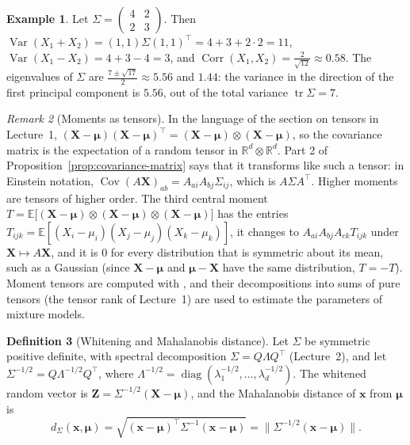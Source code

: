 \documentclass[11pt]{article}
\newcommand{\py}[1]{\texttt{\detokenize{#1}}}
\newcommand{\norm}[1]{\lVert #1 \rVert}
\newcommand{\E}{\mathbb{E}}
\DeclareMathOperator{\Var}{Var}
\DeclareMathOperator{\Cov}{Cov}
\DeclareMathOperator{\Corr}{Corr}
\theoremstyle{definition}
\newtheorem{definition}{Definition}[section]
\newtheorem{example}[definition]{Example}
\theoremstyle{plain}
\theoremstyle{remark}
\newtheorem{remark}[definition]{Remark}
\DeclareMathOperator{\tr}{tr}
\DeclareMathOperator{\diag}{diag}
\begin{document}
\begin{example}\label{ex:covariance-matrix}
    Let $\Sigma = \begin{pmatrix} 4 & 2 \\ 2 & 3 \end{pmatrix}$. Then $\Var(X_1 + X_2) = (1, 1)\Sigma(1, 1)^\top = 4 + 3 + 2 \cdot 2 = 11$, $\Var(X_1 - X_2) = 4 + 3 - 4 = 3$, and $\Corr(X_1, X_2) = \frac{2}{\sqrt{12}} \approx 0.58$. The eigenvalues of $\Sigma$ are $\frac{7 \pm \sqrt{17}}{2} \approx 5.56$ and $1.44$: the variance in the direction of the first principal component is $5.56$, out of the total variance $\tr\Sigma = 7$.
\end{example}

\begin{remark}[Moments as tensors]
    In the language of the section on tensors in Lecture~1, $(\mathbf{X} - \boldsymbol{\mu})(\mathbf{X} - \boldsymbol{\mu})^\top = (\mathbf{X} - \boldsymbol{\mu}) \otimes (\mathbf{X} - \boldsymbol{\mu})$, so the covariance matrix is the expectation of a random tensor in $\mathbb{R}^d \otimes \mathbb{R}^d$. Part 2 of Proposition~\ref{prop:covariance-matrix} says that it transforms like such a tensor: in Einstein notation, $\Cov(A\mathbf{X})_{ab} = A_{ai}A_{bj}\Sigma_{ij}$, which is $A\Sigma A^\top$. Higher moments are tensors of higher order. The third central moment $T = \E\big[(\mathbf{X} - \boldsymbol{\mu}) \otimes (\mathbf{X} - \boldsymbol{\mu}) \otimes (\mathbf{X} - \boldsymbol{\mu})\big]$ has the entries $T_{ijk} = \E[(X_i - \mu_i)(X_j - \mu_j)(X_k - \mu_k)]$, it changes to $A_{ai}A_{bj}A_{ck}T_{ijk}$ under $\mathbf{X} \mapsto A\mathbf{X}$, and it is $0$ for every distribution that is symmetric about its mean, such as a Gaussian (since $\mathbf{X} - \boldsymbol{\mu}$ and $\boldsymbol{\mu} - \mathbf{X}$ have the same distribution, $T = -T$). Moment tensors are computed with \py{np.einsum}, and their decompositions into sums of pure tensors (the tensor rank of Lecture~1) are used to estimate the parameters of mixture models.
\end{remark}

\begin{definition}[Whitening and Mahalanobis distance]\label{def:whitening}
    Let $\Sigma$ be symmetric positive definite, with spectral decomposition $\Sigma = Q\Lambda Q^\top$ (Lecture~2), and let $\Sigma^{-1/2} = Q\Lambda^{-1/2}Q^\top$, where $\Lambda^{-1/2} = \diag(\lambda_1^{-1/2}, \ldots, \lambda_d^{-1/2})$. The whitened random vector is $\mathbf{Z} = \Sigma^{-1/2}(\mathbf{X} - \boldsymbol{\mu})$, and the Mahalanobis distance of $\mathbf{x}$ from $\boldsymbol{\mu}$ is
    \[d_\Sigma(\mathbf{x}, \boldsymbol{\mu}) = \sqrt{(\mathbf{x} - \boldsymbol{\mu})^\top\Sigma^{-1}(\mathbf{x} - \boldsymbol{\mu})} = \norm{\Sigma^{-1/2}(\mathbf{x} - \boldsymbol{\mu})}.\]
\end{definition}
\end{document}
